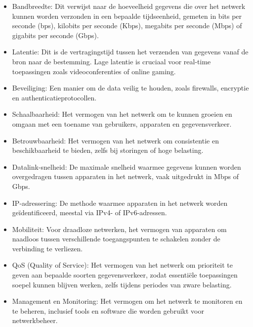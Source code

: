 \begin{itemize}
    \item Bandbreedte: Dit verwijst naar de hoeveelheid gegevens die over het netwerk kunnen worden verzonden in een bepaalde tijdseenheid, gemeten in bits per seconde (bps), kilobits per seconde (Kbps), megabits per seconde (Mbps) of gigabits per seconde (Gbps). \cite{Bandbreedte}
    \item Latentie: Dit is de vertragingstijd tussen het verzenden van gegevens vanaf de bron naar de bestemming. Lage latentie is cruciaal voor real-time toepassingen zoals videoconferenties of online gaming. \cite{Bandbreedte}
    \item Beveiliging: Een manier om de data veilig te houden, zoals firewalls, encryptie en authenticatieprotocollen.
    \item Schaalbaarheid: Het vermogen van het netwerk om te kunnen groeien en omgaan met een toename van gebruikers, apparaten en gegevensverkeer. \cite{schaalbaarheid}
    \item Betrouwbaarheid: Het vermogen van het netwerk om consistentie en beschikbaarheid te bieden, zelfs bij storingen of hoge belasting.
    \item Datalink-snelheid: De maximale snelheid waarmee gegevens kunnen worden overgedragen tussen apparaten in het netwerk, vaak uitgedrukt in Mbps of Gbps.\cite{Data}
    \item IP-adressering: De methode waarmee apparaten in het netwerk worden geïdentificeerd, meestal via IPv4- of IPv6-adressen.\cite{IP}
    \item Mobiliteit: Voor draadloze netwerken, het vermogen van apparaten om naadloos tussen verschillende toegangspunten te schakelen zonder de verbinding te verliezen.
    \item QoS (Quality of Service): Het vermogen van het netwerk om prioriteit te geven aan bepaalde soorten gegevensverkeer, zodat essentiële toepassingen soepel kunnen blijven werken, zelfs tijdens periodes van zware belasting.
    \item Management en Monitoring: Het vermogen om het netwerk te monitoren en te beheren, inclusief tools en software die worden gebruikt voor netwerkbeheer.

\end{itemize}
